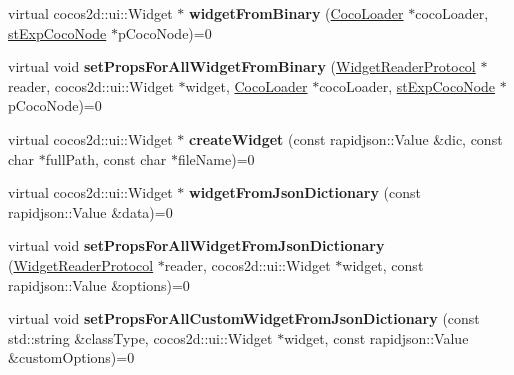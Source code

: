 \begin{DoxyCompactItemize}
virtual cocos2d\+::ui\+::\+Widget $\ast$ {\bfseries widget\+From\+Binary} (\hyperlink{classcocostudio_1_1CocoLoader}{Coco\+Loader} $\ast$coco\+Loader, \hyperlink{structcocostudio_1_1stExpCocoNode}{st\+Exp\+Coco\+Node} $\ast$p\+Coco\+Node)=0
\item 
\mbox{\label{classcocostudio_1_1WidgetPropertiesReader_a8d58afcf270efb06e7045e48a86ec31a}} 
virtual void {\bfseries set\+Props\+For\+All\+Widget\+From\+Binary} (\hyperlink{classcocostudio_1_1WidgetReaderProtocol}{Widget\+Reader\+Protocol} $\ast$reader, cocos2d\+::ui\+::\+Widget $\ast$widget, \hyperlink{classcocostudio_1_1CocoLoader}{Coco\+Loader} $\ast$coco\+Loader, \hyperlink{structcocostudio_1_1stExpCocoNode}{st\+Exp\+Coco\+Node} $\ast$p\+Coco\+Node)=0
\item 
\mbox{\label{classcocostudio_1_1WidgetPropertiesReader_ad506e2319384c875e324f52b6903a44d}} 
virtual cocos2d\+::ui\+::\+Widget $\ast$ {\bfseries create\+Widget} (const rapidjson\+::\+Value \&dic, const char $\ast$full\+Path, const char $\ast$file\+Name)=0
\item 
\mbox{\label{classcocostudio_1_1WidgetPropertiesReader_ad4121e28432302d4231c0ec6405be741}} 
virtual cocos2d\+::ui\+::\+Widget $\ast$ {\bfseries widget\+From\+Json\+Dictionary} (const rapidjson\+::\+Value \&data)=0
\item 
\mbox{\label{classcocostudio_1_1WidgetPropertiesReader_a8a100e50ac2e54322b639310dc7d0978}} 
virtual void {\bfseries set\+Props\+For\+All\+Widget\+From\+Json\+Dictionary} (\hyperlink{classcocostudio_1_1WidgetReaderProtocol}{Widget\+Reader\+Protocol} $\ast$reader, cocos2d\+::ui\+::\+Widget $\ast$widget, const rapidjson\+::\+Value \&options)=0
\item 
\mbox{\label{classcocostudio_1_1WidgetPropertiesReader_ad5ef87b3a0ab65faeeeb09c70bbe4aff}} 
virtual void {\bfseries set\+Props\+For\+All\+Custom\+Widget\+From\+Json\+Dictionary} (const std\+::string \&class\+Type, cocos2d\+::ui\+::\+Widget $\ast$widget, const rapidjson\+::\+Value \&custom\+Options)=0
\item 
\mbox{\label{classcocostudio_1_1WidgetPropertiesReader_a8403f2eb3a6e5c555e8b40c92e9f384c}} 

\end{DoxyCompactItemize}
